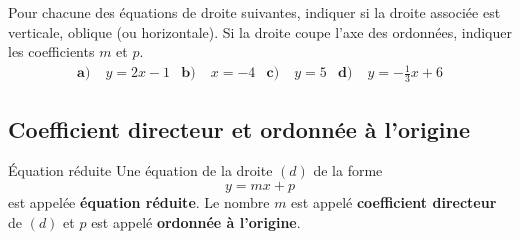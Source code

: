 \documentclass[11pt]{article}
\begin{document}
\begin{app}
  Pour chacune des équations de droite suivantes, indiquer si la droite associée
  est verticale, oblique (ou horizontale). Si la droite coupe l'axe des
  ordonnées, indiquer les coefficients $m$ et $p$.
  \begin{align*}
    \textbf{a)}\;& y = 2x-1 &
    \textbf{b)}\;& x = -4 &
    \textbf{c)}\;& y = 5 &
    \textbf{d)}\;& y = -\frac{1}{3}x+6
  \end{align*}
\end{app}

\subsection{Coefficient directeur et ordonnée à l'origine}
\begin{defi}{Équation réduite}
  Une équation de la droite $(d)$ de la forme 
  \[
    y=mx+p
  \]
  est appelée
  \textbf{équation réduite}. Le nombre $m$ est appelé \textbf{coefficient
  directeur} de $(d)$ et $p$ est appelé \textbf{ordonnée à l'origine}.
\end{defi}
\end{document}
